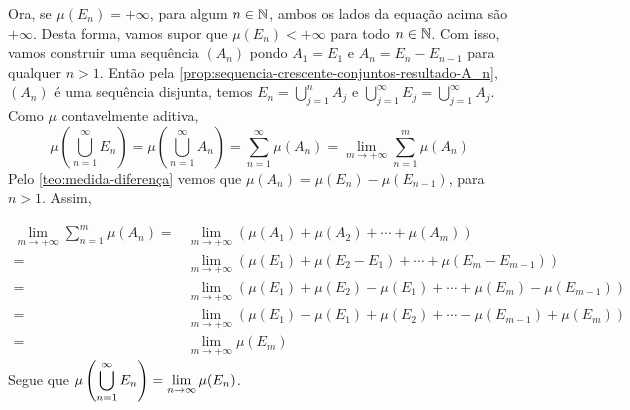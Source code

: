 \begin{prova}
    Ora, se $\mu(E_n) = +\infty$, para algum $n \in \operatorname{\mathbb{N}}$, ambos os lados da equação acima são $+\infty$.
    Desta forma, vamos supor que $\mu(E_n) < +\infty$ para todo $n \in \operatorname{\mathbb{N}}$.
    Com isso, vamos construir uma sequência $(A_n)$ pondo $A_1 = E_1$ e $A_n = E_n - E_{n-1}$ para qualquer $n>1$.
    Então pela \ref{prop:sequencia-crescente-conjuntos-resultado-A_n}, $(A_n)$ é uma sequência disjunta, temos 
    $\displaystyle E_n = \bigcup_{j = 1}^n A_j$ e 
    $\displaystyle\bigcup_{j = 1}^\infty E_j = \bigcup_{j = 1}^\infty A_j$.
    Como $\mu$ contavelmente aditiva, 
    $$\mu\left(\bigcup_{n = 1}^\infty E_n\right)
    =\mu\left(\bigcup_{n = 1}^\infty A_n\right)
    = \sum_{n = 1}^\infty \mu(A_n)
    = \lim_{m \to +\infty}\sum_{n = 1}^m \mu(A_n)$$
    Pelo  \ref{teo:medida-diferença} vemos que $\mu(A_n) = \mu(E_n) - \mu(E_{n - 1 })$, para $n > 1$.
    Assim, 
    
    \begin{align*}
        \lim_{m \to +\infty}\sum_{n = 1}^m \mu(A_n)
        =&
        \lim_{m \to +\infty}(\mu(A_1) + \mu(A_2) + \cdots +\mu(A_m))\\
        =&
        \lim_{m \to +\infty}(\mu(E_1) + \mu(E_2 - E_1) + \cdots +\mu(E_m - E_{m-1}))\\
        =&
        \lim_{m \to +\infty}(\mu(E_1) + \mu(E_2) - \mu(E_1) + \cdots +\mu(E_m) - \mu(E_{m-1}))\\
        =&
        \lim_{m \to +\infty}(\mu(E_1) - \mu(E_1) + \mu(E_2)  + \cdots  - \mu(E_{m-1}) +\mu(E_m) )\\
        =&
        \lim_{m \to +\infty} \mu(E_m)
    \end{align*}
    Segue que $\mu\left(\displaystyle \bigcup_{n = 1}^\infty E_n\right) = \displaystyle \lim_{n \to \infty} \mu(E_n)$.





    


\end{prova}

